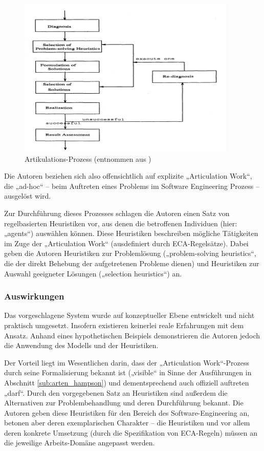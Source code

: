 \begin{figure}[htbp]
	\centering
		\includegraphics[height=3in]{img/ArticulationWork/mi91-awprocess.png}
	\caption[Artikulations-Prozess]{Artikulations-Prozess (entnommen aus \citep{Mi91})}
	\label{fig:img_ArticulationWork_mi91-awprocess}
\end{figure}

Die Autoren beziehen sich also offensichtlich auf explizite „Articulation Work“, die „ad-hoc“ -- beim Auftreten eines Problems im Software Engineering Prozess -- ausgelöst wird.

Zur Durchführung dieses Prozesses schlagen die Autoren einen Satz von regelbasierten Heuristiken vor, aus denen die betroffenen Individuen (hier: „agents“) auswählen können. Diese Heuristiken beschreiben mögliche Tätigkeiten im Zuge der „Articulation Work“ (ausdefiniert durch \gls{ECA}-Regelsätze). Dabei geben die Autoren Heuristiken zur Problemlösung („problem-solving heuristics“, die der direkt Behebung der aufgetretenen Probleme dienen) und Heuristiken zur Auswahl geeigneter Lösungen („selection heuristics“) an.

\subsubsection{Auswirkungen}

Das vorgeschlagene System wurde auf konzeptueller Ebene entwickelt und nicht praktisch umgesetzt. Insofern existieren keinerlei reale Erfahrungen mit dem Ansatz. Anhand eines hypothetischen Beispiels demonstrieren die Autoren jedoch die Anwendung des Modells und der Heuristiken.

Der Vorteil liegt im Wesentlichen darin, dass der „Articulation Work“-Prozess durch seine Formalisierung bekannt ist („visible“ in Sinne der Ausführungen in Abschnitt \ref{sub:arten_hampson}) und dementsprechend auch offiziell auftreten „darf“. Durch den vorgegebenen Satz an Heuristiken sind außerdem die Alternativen zur Problembehandlung und deren Durchführung bekannt. Die Autoren geben diese Heuristiken für den Bereich des Software-Engineering an, betonen aber deren exemplarischen Charakter -- die Heuristiken und vor allem deren konkrete Umsetzung (durch die Spezifikation von \gls{ECA}-Regeln) müssen an die jeweilige Arbeits-Domäne angepasst werden. 

